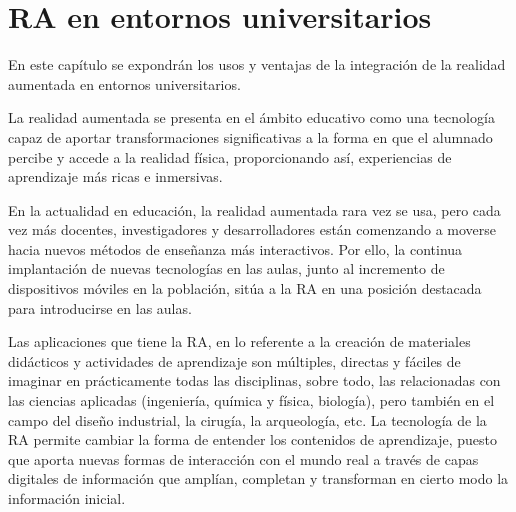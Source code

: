 %
%
%
%

\chapter{RA en entornos universitarios } \label{chap:RAEntornosUniversitarios}  

En este capítulo se expondrán los usos y ventajas de la integración de la realidad aumentada en entornos universitarios.

La realidad aumentada se presenta en el ámbito educativo como una tecnología capaz de aportar transformaciones significativas a la forma en que el alumnado percibe y accede a la realidad física, proporcionando así, experiencias de aprendizaje más ricas e inmersivas.

En la actualidad en educación, la realidad aumentada rara vez se usa, pero cada vez más docentes, investigadores y desarrolladores están comenzando a moverse hacia nuevos métodos de enseñanza más interactivos. Por ello, la continua implantación de nuevas tecnologías en las aulas, junto al incremento de dispositivos móviles en la población, sitúa a la RA en una posición destacada para introducirse en las aulas. 

Las aplicaciones que tiene la RA, en lo referente a la creación de materiales didácticos y actividades de aprendizaje son múltiples, directas y fáciles de imaginar en prácticamente todas las disciplinas, sobre todo, las relacionadas con las ciencias aplicadas (ingeniería, química y física, biología), pero también en el campo del diseño industrial, la cirugía, la arqueología, etc.
La tecnología de la RA permite cambiar la forma de entender los contenidos de aprendizaje, puesto que aporta nuevas formas de interacción con el mundo real a través de capas digitales de información que amplían, completan y transforman en cierto modo la información inicial.

